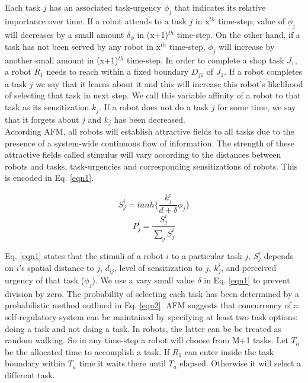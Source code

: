 \documentclass{llncs}
\begin{document}
Each task $j$ has an associated task-urgency $\phi_j$ that indicates its relative importance over time.
If a robot attends to a task $j$ in x$^{th}$ time-step, value of $\phi_j$ will decreases by a small amount $\delta_\phi$ in (x+1)$^{th}$ time-step.
On the other hand, if a task has not been served by any robot in x$^{th}$ time-step, $\phi_j$ will increase by another small amount in (x+1)$^{th}$ time-step.
In order to complete a shop task $J_1$, a robot $R_1$ needs to reach within a fixed boundary $D_{j1}$ of $J_1$.
If a robot completes a task $j$ we say that it learns about it and this will increase this robot's likelihood of selecting that task in next step.
We call this variable affinity of a robot to that task as its sensitization $k_j$.
If a robot does not do a task $j$ for some time, we say that it forgets about $j$ and $k_j$ has been decreased.\\
According AFM, all robots will establish attractive fields to all tasks due to the presence of a system-wide continuous flow of information.
The strength of these attractive fields called stimulus will vary according to the distances between robots and tasks, task-urgencies and corresponding sensitizations of robots. This is encoded in Eq. \ref{eqn1}.
\begin{small}
\begin{multicols}{2}
\begin{equation}
S_{j}^{i} = tanh\{\frac{k_{j}^{i}}{d+\delta } \phi _{j}\}
\label{eqn1}
\end{equation}
\vspace*{0.25cm}
\begin{equation}
P_{j}^{i} = \frac{S_{j}^{i}}{\sum_{j}^{}S_{j}^{i}}
\label{eqn2}
\end{equation}
\end{multicols}
\end{small}
Eq. \ref{eqn1} states that the stimuli of a robot $i$ to a particular task $j$, $S_{j}^{i}$ depends on $i$'s spatial distance to $j$, $d_{ij}$, level of sensitization to $j$, $k_{j}^{i}$, and perceived urgency of that task ($\phi _{j}$). We use a vary small value $\delta$ in Eq. \ref{eqn1} to prevent division by zero. The probability of selecting each task has been determined by a probabilistic method outlined in Eq. \ref{eqn2}.
AFM suggests that concurrency of a self-regulatory system can be maintained by specifying at least two task options: doing a task and not doing a task. In robots, the latter can be be treated as random walking. So in any time-step a robot will choose from M+1 tasks. Let $T_a$ be the allocated time to accomplish a task. If $R_1$ can enter inside the task boundary within $T_a$ time it waits there until $T_a$ elapsed. Otherwise it will select a different task.
\end{document}
